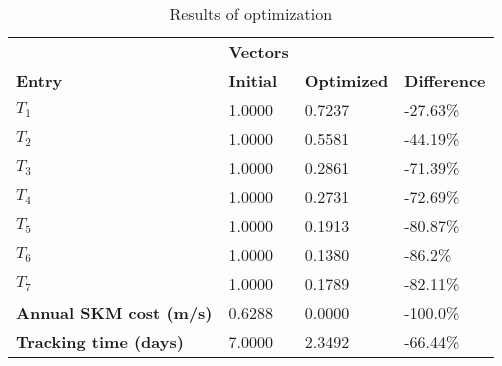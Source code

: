 \begin{table}[H]
\centering
\begin{tabular}{llll}
\textbf{}      & \cellcolor[HTML]{EFEFEF}\textbf{Vectors} & \textbf{} & \textbf{}         \\
\rowcolor[HTML]{EFEFEF} 
\textbf{Entry} & \textbf{Initial} & \textbf{Optimized} & \textbf{Difference} \\
$T_1$ & 1.0000 & 0.7237 & -27.63\% \\ 
$T_2$ & 1.0000 & 0.5581 & -44.19\% \\ 
$T_3$ & 1.0000 & 0.2861 & -71.39\% \\ 
$T_4$ & 1.0000 & 0.2731 & -72.69\% \\ 
$T_5$ & 1.0000 & 0.1913 & -80.87\% \\ 
$T_6$ & 1.0000 & 0.1380 & -86.2\% \\ 
$T_7$ & 1.0000 & 0.1789 & -82.11\% \\ 
\rowcolor[HTML]{EFEFEF} 
\textbf{Annual SKM cost (m/s)}  & 0.6288 & 0.0000 & -100.0\% \\ 
\rowcolor[HTML]{EFEFEF} 
\textbf{Tracking time (days)}  & 7.0000 & 2.3492 & -66.44\% \\ 
\end{tabular}
\caption{Results of optimization}
\label{tab:OptimizationAnalysis}
\end{table}